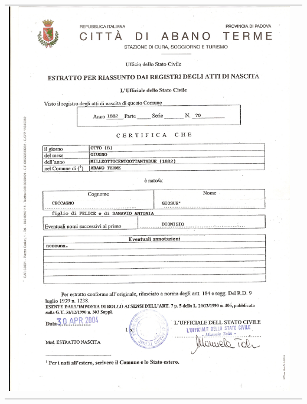 \documentclass[a4paper,10pt]{book}
\begin{document}
\begin{tabular}{ c c }
  \includegraphics[height=0.35\textheight]{../img/06-giosue.png}\label{fig:06-giosue}
  \\ \\

\end{tabular}
\end{document}

